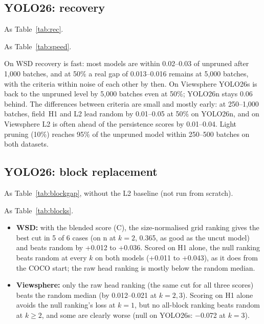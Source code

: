 \documentclass[10pt]{article}
\newcommand{\tnote}[1]{\par\vspace{3pt}\begin{minipage}{\linewidth}\footnotesize #1\end{minipage}}  %
\newcommand{\tbl}[1]{\adjustbox{max width=\linewidth}{}}
\begin{document}
\subsection{YOLO26: recovery}

\begin{table}[H]
\centering\small
\caption{From scratch: recovery after channel pruning, by training budget}
\tbl{recovery_scratch}
\tnote{As Table~\ref{tab:rec}.}
\end{table}

\begin{table}[H]
\centering\small
\caption{From scratch: training needed to reach 95\% of the unpruned model}
\tbl{recovery_speed_scratch}
\tnote{As Table~\ref{tab:speed}.}
\end{table}

On WSD recovery is fast: most models are within 0.02--0.03 of unpruned after 1,000 batches, and at
50\% a real gap of 0.013--0.016 remains at 5,000 batches, with the criteria within noise of each other
by then. On Viewsphere YOLO26s is back to the unpruned level by 5,000 batches even at 50\%; YOLO26n stays
0.06 behind. The differences between criteria are small and mostly early: at 250--1,000 batches,
field~H1 and L2 lead random by 0.01--0.05 at 50\% on YOLO26n, and on Viewsphere L2 is often ahead of
the persistence scores by 0.01--0.04. Light pruning (10\%) reaches 95\% of the unpruned model within
250--500 batches on both datasets.

\subsection{YOLO26: block replacement}

\begin{table}[H]
\centering\small
\caption{From scratch: TDA-chosen blocks vs randomly chosen blocks}
\label{tab:blockgap-s}
\tbl{block_gap_scratch}
\tnote{As Table~\ref{tab:blockgap}, without the L2 baseline (not run from scratch).}
\end{table}

\begin{table}[H]
\centering\small
\caption{From scratch: accuracy of each ranking's cut}
\tbl{blocks_scratch}
\tnote{As Table~\ref{tab:blocks}.}
\end{table}

\begin{itemize}
\item \textbf{WSD:} with the blended score (C), the size-normalised grid ranking gives the best cut in
  5 of 6 cases (on n at $k = 2$, 0.365, as good as the uncut model) and beats random by +0.012 to
  +0.036. Scored on H1 alone, the null ranking beats random at every $k$ on both models (+0.011 to
  +0.043), as it does from the COCO start; the raw head ranking is mostly below the random median.
\item \textbf{Viewsphere:} only the raw head ranking (the same cut for all three scores) beats the random
  median (by 0.012--0.021 at $k = 2, 3$). Scoring on H1 alone avoids the null ranking's loss at
  $k = 1$, but no all-block ranking beats random at $k \ge 2$, and some are clearly worse (null on
  YOLO26s: $-$0.072 at $k = 3$).
\end{itemize}
\end{document}
